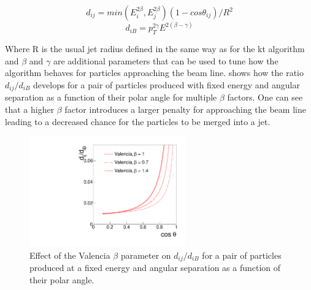 \begin{equation}
d_{ij}=min(E_i^{2\beta},E_j^{2\beta})(1-cos\theta_{ij})/R^2
\end{equation}
\begin{equation}
d_{iB}=p_T^{2\gamma}E^{2(\beta - \gamma)}
\end{equation}

Where R is the usual jet radius defined in the same way as for the kt algorithm and $\beta$ and $\gamma$ are additional parameters that can be used to tune how the algorithm behaves for particles approaching the beam line.  shows how the ratio $d_{ij}/d_{iB}$ develops for a pair of particles produced with fixed energy and angular separation as a function of their polar angle for multiple $\beta$ factors. One can see that a higher $\beta$ factor introduces a larger penalty for approaching the beam line leading to a decreased chance for the particles to be merged into a jet.

\begin{figure}
  \centering
  \includegraphics[width=0.6\textwidth]{TopAnalysis/figures/distance_ratio_vlc.pdf}
  \caption[Effect of the Valencia $\beta$ parameter]{Effect of the Valencia $\beta$ parameter on $d_{ij}/d_{iB}$ for a pair of particles produced at a fixed energy and angular separation as a function of their polar angle\cite{Boronat:2014hva}.}
  \label{fig:valenciaPerformance}
\end{figure}

